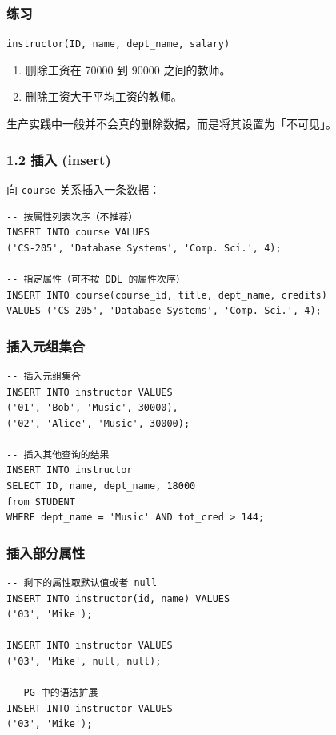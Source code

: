 \documentclass[aspectratio=169, 14pt]{beamer}
\begin{document}
\begin{frame}
    \frametitle{练习}
    \texttt{instructor(ID, name, dept\_name, salary)}
    
    \begin{enumerate}
        \item 删除工资在 70000 到 90000 之间的教师。
        \item 删除工资大于平均工资的教师。
    \end{enumerate}

\end{frame}

{
\begin{frame}[standout]
  生产实践中一般并不会真的删除数据，而是将其设置为「不可见」。
\end{frame}
}

\begin{frame}[fragile]
    \frametitle{1.2 插入 (insert)}
向 \texttt{course} 关系插入一条数据：

\begin{verbatim}
-- 按属性列表次序（不推荐）
INSERT INTO course VALUES 
('CS-205', 'Database Systems', 'Comp. Sci.', 4);

-- 指定属性（可不按 DDL 的属性次序）
INSERT INTO course(course_id, title, dept_name, credits)
VALUES ('CS-205', 'Database Systems', 'Comp. Sci.', 4);
\end{verbatim}    

\end{frame}

\begin{frame}[fragile]
    \frametitle{插入元组集合}
    \begin{verbatim}
-- 插入元组集合
INSERT INTO instructor VALUES 
('01', 'Bob', 'Music', 30000),
('02', 'Alice', 'Music', 30000);

-- 插入其他查询的结果
INSERT INTO instructor
SELECT ID, name, dept_name, 18000
from STUDENT 
WHERE dept_name = 'Music' AND tot_cred > 144;
    \end{verbatim} 

\end{frame}

\begin{frame}[fragile]
    \frametitle{插入部分属性}
    \begin{verbatim}
-- 剩下的属性取默认值或者 null
INSERT INTO instructor(id, name) VALUES 
('03', 'Mike');

INSERT INTO instructor VALUES 
('03', 'Mike', null, null);

-- PG 中的语法扩展
INSERT INTO instructor VALUES 
('03', 'Mike');
    \end{verbatim}
\end{frame}
\end{document}
